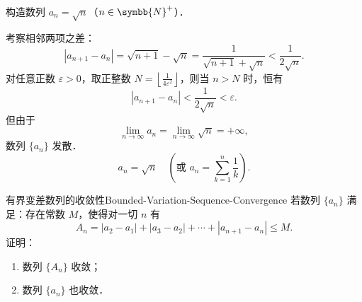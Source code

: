 \begin{solution}
    构造数列 $a_n = \sqrt{n}$（$n \in \symbb{N}^+$）．

    考察相邻两项之差：
    \begin{equation}
        |a_{n+1} - a_n| = \sqrt{n+1} - \sqrt{n} = \frac{1}{\sqrt{n+1} + \sqrt{n}} < \frac{1}{2\sqrt{n}}.
    \end{equation}
    对任意正数 $\varepsilon > 0$，取正整数 $N = \left\lfloor \frac{1}{4\varepsilon^2} \right\rfloor$，则当 $n > N$ 时，恒有
    \begin{equation}
        |a_{n+1} - a_n| < \frac{1}{2\sqrt{n}} < \varepsilon.
    \end{equation}
    但由于
    \begin{equation}
        \lim_{n\to\infty} a_n = \lim_{n\to\infty} \sqrt{n} = +\infty,
    \end{equation}
    数列 $\{a_n\}$ 发散．
    \begin{equation}
        \boxed{a_n = \sqrt{n} \quad \left(\text{或 } a_n = \sum_{k=1}^n \frac{1}{k}\right).}
    \end{equation}
\end{solution}

\begin{problem}{有界变差数列的收敛性}{Bounded-Variation-Sequence-Convergence}
    若数列 $\{a_n\}$ 满足：存在常数 $M$，使得对一切 $n$ 有
    \begin{equation}
        A_n = |a_2 - a_1| + |a_3 - a_2| + \cdots + |a_{n+1} - a_n| \leqslant M.
    \end{equation}
    证明：
    \begin{enumerate}
        \item 数列 $\{A_n\}$ 收敛；
        \item 数列 $\{a_n\}$ 也收敛．
    \end{enumerate}
\end{problem}

